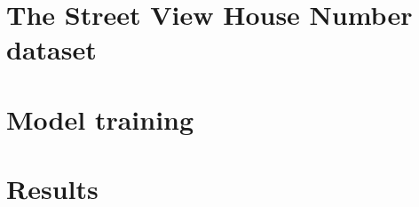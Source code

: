 \documentclass[12pt]{article}
\begin{document}



\section*{The Street View House Number dataset}

\section*{Model training}

\section*{Results}
\end{document}
